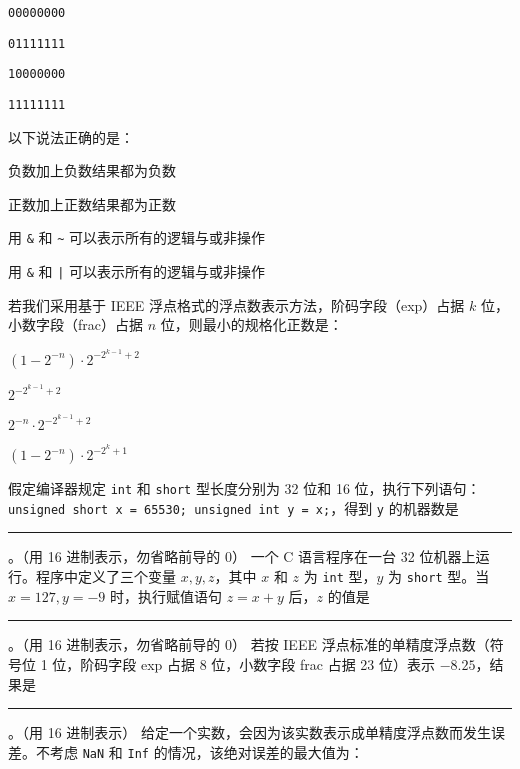 \begin{problems}
\begin{figure}[H]
			\centering
		\end{figure}
		\begin{choices}
			\item \texttt{00000000}
			\item \texttt{01111111}
			\item \texttt{10000000}
			\item \texttt{11111111}
		\end{choices}
		 以下说法正确的是：
		\begin{choices}
			\item 负数加上负数结果都为负数
			\item 正数加上正数结果都为正数
			\item 用 \verb|&| 和 \verb|~| 可以表示所有的逻辑与或非操作
			\item 用 \verb|&| 和 \verb+|+ 可以表示所有的逻辑与或非操作
		\end{choices}
		 若我们采用基于 IEEE 浮点格式的浮点数表示方法，阶码字段（exp）占据 $k$ 位，小数字段（frac）占据 $n$ 位，则最小的规格化正数是：
		\begin{choices}
			\item $(1-2^{-n}) \cdot 2^{-2^{k-1}+2}$
			\item $2^{-2^{k-1}+2}$
			\item $2^{-n} \cdot 2^{-2^{k-1}+2}$
			\item $(1-2^{-n}) \cdot 2^{-2^k+1}$
		\end{choices}
		 假定编译器规定 \texttt{int} 和 \texttt{short} 型长度分别为 32 位和 16 位，执行下列语句：\texttt{unsigned short x = 65530; unsigned int y = x;}，得到 \texttt{y} 的机器数是 \rule{2.5cm}{0.25mm}。（用 16 进制表示，勿省略前导的 0）
		 一个 C 语言程序在一台 32 位机器上运行。程序中定义了三个变量 $x, y, z$，其中 $x$ 和 $z$ 为 \texttt{int} 型，$y$ 为 \texttt{short} 型。当 $x=127, y=-9$ 时，执行赋值语句 $z=x+y$ 后，$z$ 的值是 \rule{2.5cm}{0.25mm}。（用 16 进制表示，勿省略前导的 0）
		 若按 IEEE 浮点标准的单精度浮点数（符号位 1 位，阶码字段 exp 占据 8 位，小数字段 frac 占据 23 位）表示 $-8.25$，结果是 \rule{2.5cm}{0.25mm}。（用 16 进制表示）
		 给定一个实数，会因为该实数表示成单精度浮点数而发生误差。不考虑 \texttt{NaN} 和 \texttt{Inf} 的情况，该绝对误差的最大值为：

\end{problems}
